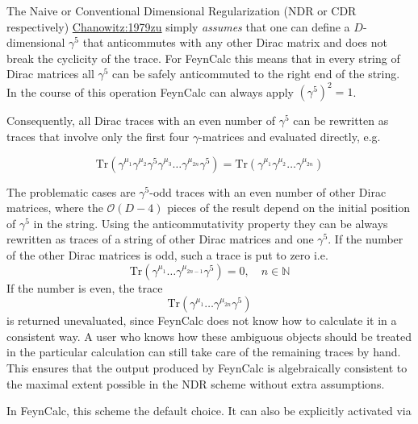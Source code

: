 \documentclass[../FeynCalcManual.tex]{subfiles}
\begin{document}
The Naive or Conventional Dimensional Regularization (NDR or CDR
respectively)
\href{https://doi.org/10.1016/0550-3213(79)90333-X}{Chanowitz:1979zu}
simply \emph{assumes} that one can define a \(D\)-dimensional
\(\gamma^5\) that anticommutes with any other Dirac matrix and does not
break the cyclicity of the trace. For FeynCalc this means that in every
string of Dirac matrices all \(\gamma^5\) can be safely anticommuted to
the right end of the string. In the course of this operation FeynCalc
can always apply \((\gamma^5)^2 = 1\).

Consequently, all Dirac traces with an even number of \(\gamma^5\) can
be rewritten as traces that involve only the first four
\(\gamma\)-matrices and evaluated directly, e.g.

\begin{equation}
\mathrm{Tr}( \gamma^{\mu_1} \gamma^{\mu_2} \gamma^5 \gamma^{\mu_3} \ldots \gamma^{\mu_{2n}} \gamma^5 ) = 
\mathrm{Tr}( \gamma^{\mu_1} \gamma^{\mu_2} \ldots \gamma^{\mu_{2n}}  )
\end{equation}

The problematic cases are \(\gamma^5\)-odd traces with an even number of
other Dirac matrices, where the \(\mathcal{O}(D-4)\) pieces of the
result depend on the initial position of \(\gamma^5\) in the string.
Using the anticommutativity property they can be always rewritten as
traces of a string of other Dirac matrices and one \(\gamma^5\). If the
number of the other Dirac matrices is odd, such a trace is put to zero
i.e. \begin{equation}
\mathrm{Tr}(\gamma^{\mu_1} \ldots \gamma^{\mu_{2n-1}} \gamma^5) = 0, \quad n \in \mathbb{N}
\end{equation} If the number is even, the trace \begin{equation}
\mathrm{Tr}(\gamma^{\mu_1} \ldots \gamma^{\mu_{2n}} \gamma^5)
\end{equation} is returned unevaluated, since FeynCalc does not know how
to calculate it in a consistent way. A user who knows how these
ambiguous objects should be treated in the particular calculation can
still take care of the remaining traces by hand. This ensures that the
output produced by FeynCalc is algebraically consistent to the maximal
extent possible in the NDR scheme without extra assumptions.

In FeynCalc, this scheme the default choice. It can also be explicitly
activated via

\begin{Shaded}
\begin{Highlighting}[]
\OperatorTok{[}\OperatorTok{]}
\end{Highlighting}
\end{Shaded}
\end{document}

